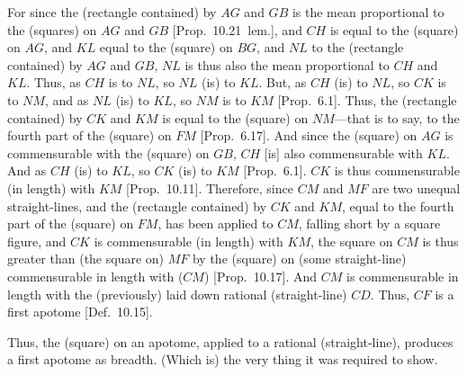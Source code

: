 \begin{Parallel}{}{}
{For since the (rectangle contained) by $AG$ and $GB$ is the
mean proportional to the (squares) on $AG$ and $GB$ [Prop.~10.21~lem.], and $CH$ is equal
to the (square) on $AG$, and $KL$ equal to the (square) on 
$BG$, and $NL$ to the (rectangle contained) by $AG$ and $GB$,
$NL$ is thus also the mean proportional to $CH$ and $KL$. Thus,
as $CH$ is to $NL$, so $NL$ (is) to $KL$. But, as $CH$ (is) to
$NL$, so $CK$ is to $NM$, and as $NL$ (is) to $KL$, so
$NM$ is to $KM$ [Prop.~6.1]. 
Thus, the (rectangle contained) by $CK$ and $KM$
is equal to the (square) on $NM$---that is to say, to the fourth
part of the (square) on $FM$ [Prop.~6.17]. 
And since the (square) on $AG$ is commensurable with the
(square) on $GB$, $CH$ [is] also commensurable with
$KL$. And as $CH$ (is) to $KL$, so $CK$ (is) to $KM$ [Prop.~6.1]. $CK$ is thus
commensurable (in length) with $KM$ [Prop.~10.11].  Therefore, since $CM$ and
$MF$ are two unequal straight-lines, and the (rectangle
contained) by $CK$ and $KM$, equal to the fourth part of the
(square) on $FM$, has been applied to $CM$, falling short by a square figure, and $CK$ is commensurable
(in length) with $KM$,  the square on $CM$ is thus greater than
(the square on) $MF$ by the (square) on (some straight-line)
commensurable in length with ($CM$) [Prop.~10.17]. 
And $CM$ is commensurable in length with the (previously) laid down rational (straight-line) $CD$. Thus, $CF$ is a first apotome [Def.~10.15].

Thus, the (square) on an apotome, applied to a rational (straight-line),
produces  a first apotome as breadth. (Which is) the very thing it was required to show.}
\end{Parallel}

